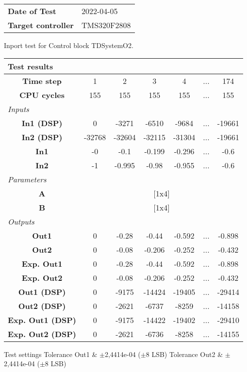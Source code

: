 \begin{tabular}{l l}
\textbf{Date of Test} & 2022-04-05 \tabularnewline
\textbf{Target controller} & TMS320F2808 \tabularnewline
\end{tabular}
\vspace{1ex}
Inport test for Control block TDSystemO2.

\vspace{1em}
\begin{tabularx}{\textwidth}{|c|c|c|c|c|>{\centering\arraybackslash}X|c|}
\hline
\multicolumn{7}{|l|}{\cellcolor[gray]{0.8}\textbf{Test results}} \tabularnewline \hline
\textbf{Time step} & 1 & 2 & 3 & 4 & ... & 174 \tabularnewline \hline
\textbf{CPU cycles} & 155 & 155 & 155 & 155 & ... & 155 \tabularnewline \hline
\multicolumn{7}{|l|}{\cellcolor[gray]{0.9}\textit{Inputs}} \tabularnewline \hline
\textbf{In1 (DSP)} & 0 & -3271 & -6510 & -9684 & ... & -19661 \tabularnewline \hline
\textbf{In2 (DSP)} & -32768 & -32604 & -32115 & -31304 & ... & -19661 \tabularnewline \hline
\textbf{In1} & -0 & -0.1 & -0.199 & -0.296 & ... & -0.6 \tabularnewline \hline
\textbf{In2} & -1 & -0.995 & -0.98 & -0.955 & ... & -0.6 \tabularnewline \hline
\multicolumn{7}{|l|}{\cellcolor[gray]{0.9}\textit{Parameters}} \tabularnewline \hline
\textbf{A} & \multicolumn{6}{c|}{[1x4]} \tabularnewline \hline
\textbf{B} & \multicolumn{6}{c|}{[1x4]} \tabularnewline \hline
\multicolumn{7}{|l|}{\cellcolor[gray]{0.9}\textit{Outputs}} \tabularnewline \hline
\textbf{Out1} & 0 & -0.28 & -0.44 & -0.592 & ... & -0.898 \tabularnewline \hline
\textbf{Out2} & 0 & -0.08 & -0.206 & -0.252 & ... & -0.432 \tabularnewline \hline
\textbf{Exp. Out1} & 0 & -0.28 & -0.44 & -0.592 & ... & -0.898 \tabularnewline \hline
\textbf{Exp. Out2} & 0 & -0.08 & -0.206 & -0.252 & ... & -0.432 \tabularnewline \hline
\textbf{Out1 (DSP)} & 0 & -9175 & -14424 & -19405 & ... & -29414 \tabularnewline \hline
\textbf{Out2 (DSP)} & 0 & -2621 & -6737 & -8259 & ... & -14158 \tabularnewline \hline
\textbf{Exp. Out1 (DSP)} & 0 & -9175 & -14422 & -19402 & ... & -29410 \tabularnewline \hline
\textbf{Exp. Out2 (DSP)} & 0 & -2621 & -6736 & -8258 & ... & -14155 \tabularnewline \hline
\end{tabularx}
\vspace{1ex}

\begin{XtoCtabular}{Test settings}
Tolerance Out1 & $\pm$2,4414e-04 ($\pm$8 LSB) \tabularnewline \hline
Tolerance Out2 & $\pm$2,4414e-04 ($\pm$8 LSB) \tabularnewline \hline
\end{XtoCtabular}

